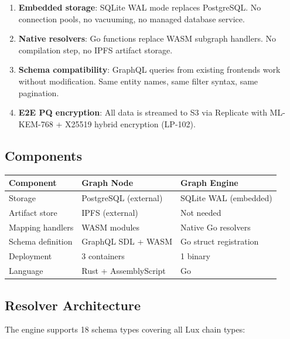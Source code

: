 \documentclass[11pt,a4paper]{article}
\begin{document}
\begin{enumerate}
\item \textbf{Embedded storage}: SQLite WAL mode replaces PostgreSQL. No connection pools,
      no vacuuming, no managed database service.
\item \textbf{Native resolvers}: Go functions replace WASM subgraph handlers. No compilation
      step, no IPFS artifact storage.
\item \textbf{Schema compatibility}: GraphQL queries from existing frontends work without
      modification. Same entity names, same filter syntax, same pagination.
\item \textbf{E2E PQ encryption}: All data is streamed to S3 via Replicate with ML-KEM-768
      + X25519 hybrid encryption (LP-102).
\end{enumerate}

\subsection{Components}

\begin{table}[H]
\centering
\begin{tabularx}{\textwidth}{lXX}
\toprule
\textbf{Component} & \textbf{Graph Node} & \textbf{Graph Engine} \\
\midrule
Storage & PostgreSQL (external) & SQLite WAL (embedded) \\
Artifact store & IPFS (external) & Not needed \\
Mapping handlers & WASM modules & Native Go resolvers \\
Schema definition & GraphQL SDL + WASM & Go struct registration \\
Deployment & 3 containers & 1 binary \\
Language & Rust + AssemblyScript & Go \\
\bottomrule
\end{tabularx}
\end{table}

\subsection{Resolver Architecture}

The engine supports 18 schema types covering all Lux chain types:
\end{document}
